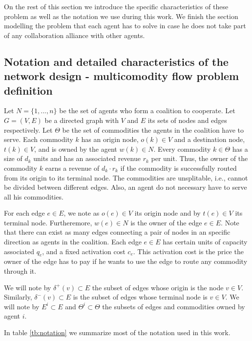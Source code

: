 \documentclass{article}
\begin{document}
On the rest of this section we introduce the specific characteristics of these problem as well as the notation we use during this work. We finish the section modelling the problem that each agent has to solve in case he does not take part of any collaboration alliance with other agents.

\subsection{Notation and detailed characteristics of the network design - multicomodity flow problem definition}
Let $N=\{1,...,n\}$ be the set of agents who form a coalition to cooperate. Let $G=(V,E)$ be a directed graph with
$V$ and $E$ its sets of nodes and edges respectively. 
Let $\Theta$ be the set of commodities the agents in the coalition have to serve. Each commodity $k$ has an origin node, $o(k)\in V$ and a destination node, $t(k)\in V$, and is owned by the agent $w(k)\in N$. Every commodity $k\in\Theta$ has a size of $d_k$ units and has an associated revenue $r_k$ per unit. Thus, the owner of the commodity $k$ earns a revenue of $d_k\cdot r_k$ if the commodity is successfully routed from its origin to its terminal node. The commodities are unsplitable, i.e., cannot be divided between different edges. Also, an agent do not necessary have to serve all his commodities.

For each edge $e \in E$, we note as $o(e)\in V$ its origin node and by $t(e)\in V$ its terminal node. Furtheremore, $w(e)\in N$ is the owner of the edge $e\in E$. Note that there can exist as many edges connecting a pair of nodes in an specific direction as agents in the coalition. Each edge $e \in E$ has certain units of capacity associated $q_e$, and a fixed activation
cost $c_e$. This activation cost is the price the owner of the edge has to pay if he wants to use the edge to route any commodity through it.

We will note by $\delta^+(v)\subset E$ the subset of edges whose origin is the node $v\in V$. Similarly, $\delta^-(v)\subset E$ is the subset of edges whose terminal node is $v\in V$. We will note by $E^i \subset E$ and $\Theta^i\subset \Theta$ the subsets of edges and commodities owned by agent $i$.

In table \ref{tb:notation} we summarize most of the notation used in this work.
\end{document}
